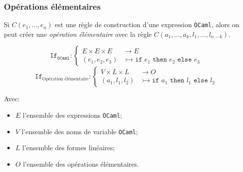 \addtocounter{framenumber}{-1}
\begin{frame}[t]
    \frametitle{Opérations élémentaires}
    \small
    \vspace{-0.2cm}

    \begin{definition}
        Si $C(e_1, \ldots, e_n)$ est une règle de construction d'une expression
        \texttt{OCaml}, alors on peut créer une \textit{opération élémentaire}
        avec la règle $C(a_1, \ldots, a_k, l_1, \ldots, l_{n - k})$.
    \end{definition}

    $$
        \texttt{If}_{\texttt{OCaml}}: \left\{ \begin{aligned}
            E \times E \times E & \rightarrow E                                                            \\
            (e_1, e_2, e_3)     & \rightarrowtail \texttt{if } e_1 \texttt{ then } e_2 \texttt{ else } e_3
        \end{aligned} \right.
    $$
    \pause
    $$
        \texttt{If}_{\text{Opération élémentaire}}: \left\{ \begin{aligned}
            V \times L \times L & \rightarrow O                                                            \\
            (a_1, l_1, l_2)     & \rightarrowtail \texttt{if } a_1 \texttt{ then } l_1 \texttt{ else } l_2
        \end{aligned} \right.
    $$

    Avec:
    \begin{itemize}
        \item $E$ l'ensemble des expressions \texttt{OCaml};
        \item $V$ l'ensemble des noms de variable \texttt{OCaml};
        \item $L$ l'ensemble des formes linéaires;
        \item $O$ l'ensemble des opérations élémentaires.
    \end{itemize}
\end{frame}


